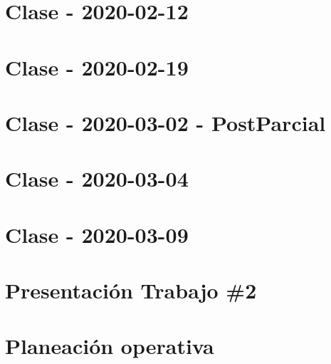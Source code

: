 \documentclass[openany]{book}
\begin{document}
\chapter{Clase - 2020-02-12}


\chapter{Clase - 2020-02-19}


\chapter{Clase - 2020-03-02 - PostParcial}


\chapter{Clase - 2020-03-04}


\chapter{Clase - 2020-03-09}





\chapter{Presentación Trabajo \#2}


\chapter{Planeación operativa}

\end{document}
